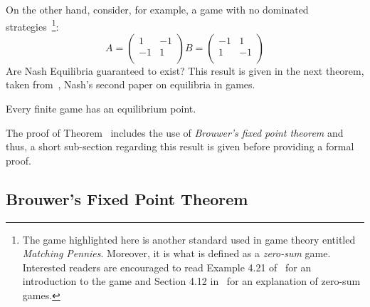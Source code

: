 On the other hand, consider, for example, a game with no dominated
strategies~\footnote{The game highlighted here is another standard used in game
theory entitled \emph{Matching Pennies}. Moreover, it is what is defined as a
\emph{zero-sum} game. Interested readers are encouraged to read Example 4.21
of~\cite{Webb2007} for an introduction to the game and Section 4.12
in~\cite{maschler_solan_zamir_2013} for an explanation of zero-sum games.}:
\[
    A =
    \begin{pmatrix}
        1 & -1\\
        -1 & 1\\
    \end{pmatrix}

    B =
    \begin{pmatrix}
        -1 & 1\\
        1 & -1\\
    \end{pmatrix}
\]
Are Nash Equilibria guaranteed to exist? This result is given in the next
theorem, taken from~\cite{nash1951non}, Nash's second paper on equilibria in games.

\begin{theorem}\label{thm:Nash}
    Every finite game has an equilibrium point.
\end{theorem}

The proof of Theorem~\label{thm:Nash} includes the use of \emph{Brouwer's fixed
point theorem} and thus, a short sub-section regarding this result is given
before providing a formal proof.

\subsection{Brouwer's Fixed Point Theorem}\label{subsec:Brouwer_thm}


